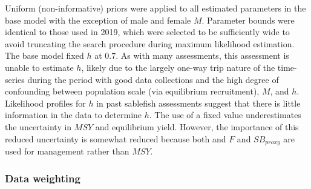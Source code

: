 \documentclass[11pt,
  english,
  a4paper,
]{article}
\begin{document}
\leavevmode\tagmcend\tagstructend


Uniform (non-informative) priors were applied to all estimated parameters in the base model with the exception of male and female {\(M\)\leavevmode\tagmcend\tagstructend}. Parameter bounds were identical to those used in 2019, which were selected to be sufficiently wide to avoid truncating the search procedure during maximum likelihood estimation. The base model fixed {\(h\)\leavevmode\tagmcend\tagstructend} at 0.7. As with many assessments, this assessment is unable to estimate {\(h\)\leavevmode\tagmcend\tagstructend}, likely due to the largely one-way trip nature of the time-series during the period with good data collections and the high degree of confounding between population scale (via equilibrium recruitment), {\(M\)\leavevmode\tagmcend\tagstructend}, and {\(h\)\leavevmode\tagmcend\tagstructend}. Likelihood profiles for {\(h\)\leavevmode\tagmcend\tagstructend} in past sablefish assessments suggest that there is little information in the data to determine {\(h\)\leavevmode\tagmcend\tagstructend}. The use of a fixed value underestimates the uncertainty in {\(MSY\)\leavevmode\tagmcend\tagstructend} and equilibrium yield. However, the importance of this reduced uncertainty is somewhat reduced because both and {\(F\)\leavevmode\tagmcend\tagstructend} and {\(SB_{proxy}\)\leavevmode\tagmcend\tagstructend} are used for management rather than {\(MSY\)\leavevmode\tagmcend\tagstructend}.

\leavevmode\tagmcend\tagstructend\par


\hypertarget{dw}{%
\subsubsection{Data weighting}\label{dw}}
\end{document}
